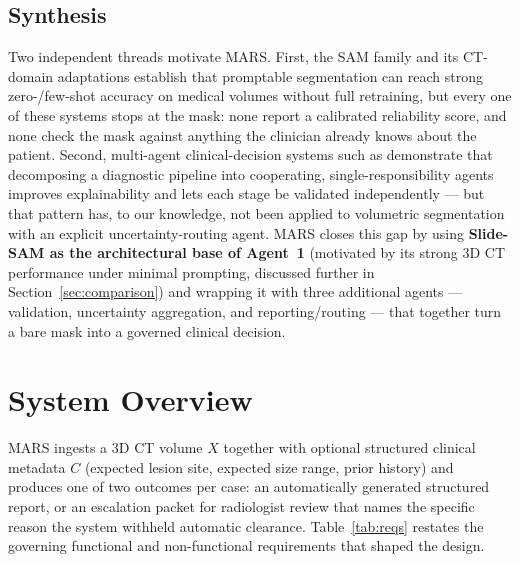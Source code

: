 \documentclass[11pt,a4paper]{article}
\begin{document}
\subsection{Synthesis}
Two independent threads motivate MARS. First, the SAM family \cite{sam,sam2,sam3} and its CT-domain adaptations \cite{caroline,slidesam} establish that promptable segmentation can reach strong zero-/few-shot accuracy on medical volumes without full retraining, but every one of these systems stops at the mask: none report a calibrated reliability score, and none check the mask against anything the clinician already knows about the patient. Second, multi-agent clinical-decision systems such as \cite{triage} demonstrate that decomposing a diagnostic pipeline into cooperating, single-responsibility agents improves explainability and lets each stage be validated independently — but that pattern has, to our knowledge, not been applied to volumetric segmentation with an explicit uncertainty-routing agent. MARS closes this gap by using \textbf{Slide-SAM as the architectural base of Agent~1} (motivated by its strong 3D CT performance under minimal prompting, discussed further in Section~\ref{sec:comparison}) and wrapping it with three additional agents --- validation, uncertainty aggregation, and reporting/routing --- that together turn a bare mask into a governed clinical decision.

\section{System Overview}
\label{sec:overview}

MARS ingests a 3D CT volume $X$ together with optional structured clinical metadata $C$ (expected lesion site, expected size range, prior history) and produces one of two outcomes per case: an automatically generated structured report, or an escalation packet for radiologist review that names the specific reason the system withheld automatic clearance. Table~\ref{tab:reqs} restates the governing functional and non-functional requirements that shaped the design.
\end{document}
